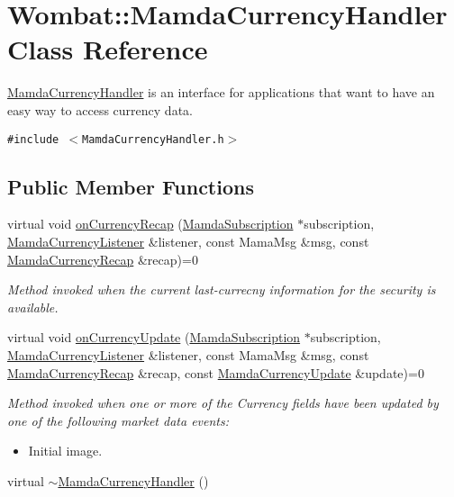 \hypertarget{classWombat_1_1MamdaCurrencyHandler}{
\section{Wombat::Mamda\-Currency\-Handler Class Reference}
\label{classWombat_1_1MamdaCurrencyHandler}
}
\hyperlink{classWombat_1_1MamdaCurrencyHandler}{Mamda\-Currency\-Handler} is an interface for applications that want to have an easy way to access currency data.  


{\tt \#include $<$Mamda\-Currency\-Handler.h$>$}

\subsection*{Public Member Functions}
\begin{CompactItemize}
\item 
virtual void \hyperlink{classWombat_1_1MamdaCurrencyHandler_f267714c669e651a19294a5574c73156}{on\-Currency\-Recap} (\hyperlink{classWombat_1_1MamdaSubscription}{Mamda\-Subscription} $\ast$subscription, \hyperlink{classWombat_1_1MamdaCurrencyListener}{Mamda\-Currency\-Listener} \&listener, const Mama\-Msg \&msg, const \hyperlink{classWombat_1_1MamdaCurrencyRecap}{Mamda\-Currency\-Recap} \&recap)=0
\begin{CompactList}\small\item\em Method invoked when the current last-currecny information for the security is available. \item\end{CompactList}\item 
virtual void \hyperlink{classWombat_1_1MamdaCurrencyHandler_637c28d3d42ff832c798fd0615934200}{on\-Currency\-Update} (\hyperlink{classWombat_1_1MamdaSubscription}{Mamda\-Subscription} $\ast$subscription, \hyperlink{classWombat_1_1MamdaCurrencyListener}{Mamda\-Currency\-Listener} \&listener, const Mama\-Msg \&msg, const \hyperlink{classWombat_1_1MamdaCurrencyRecap}{Mamda\-Currency\-Recap} \&recap, const \hyperlink{classWombat_1_1MamdaCurrencyUpdate}{Mamda\-Currency\-Update} \&update)=0
\begin{CompactList}\small\item\em Method invoked when one or more of the Currency fields have been updated by one of the following market data events:\begin{itemize}
\item Initial image. \end{itemize}
\item\end{CompactList}\item 
virtual \hyperlink{classWombat_1_1MamdaCurrencyHandler_4a7db6d54b97ad559a46654cef8f2356}{$\sim$Mamda\-Currency\-Handler} ()
\end{CompactItemize}


